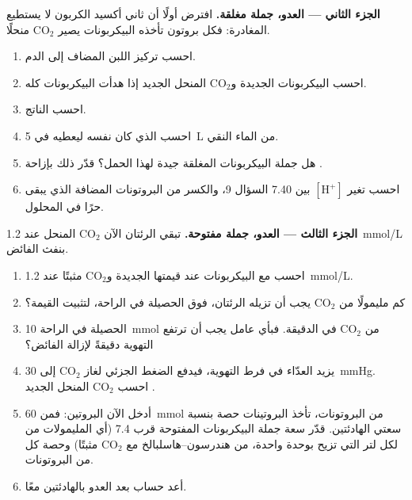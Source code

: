 \begin{problem}
\medskip
\noindent\textbf{الجزء الثاني --- العدو، جملة مغلقة.}
افترض أولًا أن ثاني أكسيد الكربون لا يستطيع المغادرة: فكل بروتون
تأخذه البيكربونات يصير $\mathrm{CO_2}$ منحلًا.
\begin{enumerate}[resume]
  \item احسب تركيز  اللبن المضاف إلى الدم.
  \item احسب البيكربونات الجديدة و$\mathrm{CO_2}$ المنحل الجديد إذا
        هدأت البيكربونات  كله.
  \item احسب  الناتج.
  \item احسب  الذي كان  نفسه ليعطيه في \qty{5}{L} من الماء
        النقي.
  \item هل جملة البيكربونات المغلقة  جيدة لهذا الحمل؟ قدّر ذلك
        بإزاحة .
  \item احسب تغير $[\mathrm{H^+}]$ بين  7.40  السؤال 9، والكسر
        من البروتونات المضافة الذي يبقى حرًا في المحلول.
\end{enumerate}

\medskip
\noindent\textbf{الجزء الثالث --- العدو، جملة مفتوحة.}
تبقي الرئتان الآن $\mathrm{CO_2}$ المنحل عند \qty{1.2}{mmol/L}
بنفث الفائض.
\begin{enumerate}[resume]
  \item احسب  مع البيكربونات عند قيمتها الجديدة و$\mathrm{CO_2}$
        مثبتًا عند \qty{1.2}{mmol/L}.
  \item كم مليمولًا من $\mathrm{CO_2}$ يجب أن تزيله الرئتان، فوق
        الحصيلة في الراحة، لتثبيت القيمة؟
  \item الحصيلة في الراحة \qty{10}{mmol} من $\mathrm{CO_2}$ في
        الدقيقة. فبأي عامل يجب أن ترتفع التهوية دقيقةً لإزالة الفائض؟
  \item يزيد العدّاء في فرط التهوية، فيدفع الضغط الجزئي
        لغاز $\mathrm{CO_2}$ إلى \qty{30}{mmHg}. احسب $\mathrm{CO_2}$
        المنحل الجديد .
  \item أدخل الآن  البروتين: فمن \qty{60}{mmol} من البروتونات،
        تأخذ البروتينات حصة بنسبة سعتي الهادئتين. قدّر سعة جملة
        البيكربونات المفتوحة قرب  7.4 (أي المليمولات من  لكل
        لتر التي تزيح  بوحدة واحدة، من هندرسون--هاسلبالخ
        مع $\mathrm{CO_2}$ مثبتًا) وحصة كل  من البروتونات.
  \item أعد حساب  بعد العدو بالهادئتين معًا.
\end{enumerate}


\end{problem}
